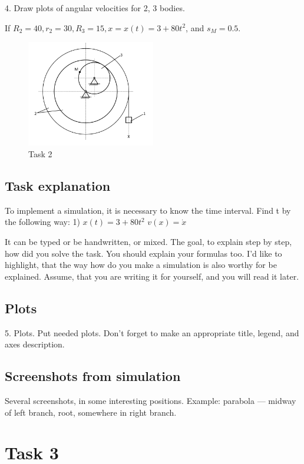 4. Draw plots of angular velocities for 2, 3 bodies.


If \( R_2 = 40, r_2 = 30, R_3 = 15, x = x(t) = 3 + 80t^2 \), and \( s_M = 0.5 \).

\begin{figure}[H]
    \centering
    \includegraphics[width=0.5\textwidth]{Task2.png}
    \caption{Task 2\label{Task 2}}
\end{figure}

\subsection{Task explanation}

To implement a simulation, it is necessary to know the time interval. Find t by the following way:
1) \(x(t) = 3 + 80t^2 \)
\( v(x) = \dot x\)

It can be typed or be handwritten, or mixed. The goal, to explain step by step, how did
you solve the task. You should explain your formulas too.
I’d like to highlight, that the way how do you make a simulation is also worthy for be explained.
Assume, that you are writing it for yourself, and you will read it later.

\subsection{Plots}
5. Plots. Put needed plots. Don’t forget to make an appropriate title, legend, and axes description.
\subsection{Screenshots from simulation}

Several screenshots, in some interesting positions. Example: parabola —
midway of left branch, root, somewhere in right branch.


\section{Task 3}

